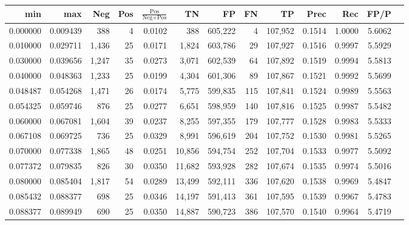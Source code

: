 \begin{tabular}{rrrrrrrrrrrrr}
\toprule
     min &      max &   Neg & Pos & $\frac{\text{Pos}}{\text{Neg}+\text{Pos}}$ &      TN &      FP &      FN &      TP &   Prec &    Rec &   FP/P \\
\midrule
0.000000 & 0.009439 &   388 &   4 &                                     0.0102 &     388 & 605,222 &       4 & 107,952 & 0.1514 & 1.0000 & 5.6062 \\
0.010000 & 0.029711 & 1,436 &  25 &                                     0.0171 &   1,824 & 603,786 &      29 & 107,927 & 0.1516 & 0.9997 & 5.5929 \\
0.030000 & 0.039656 & 1,247 &  35 &                                     0.0273 &   3,071 & 602,539 &      64 & 107,892 & 0.1519 & 0.9994 & 5.5813 \\
0.040000 & 0.048363 & 1,233 &  25 &                                     0.0199 &   4,304 & 601,306 &      89 & 107,867 & 0.1521 & 0.9992 & 5.5699 \\
0.048487 & 0.054268 & 1,471 &  26 &                                     0.0174 &   5,775 & 599,835 &     115 & 107,841 & 0.1524 & 0.9989 & 5.5563 \\
0.054325 & 0.059746 &   876 &  25 &                                     0.0277 &   6,651 & 598,959 &     140 & 107,816 & 0.1525 & 0.9987 & 5.5482 \\
0.060000 & 0.067081 & 1,604 &  39 &                                     0.0237 &   8,255 & 597,355 &     179 & 107,777 & 0.1528 & 0.9983 & 5.5333 \\
0.067108 & 0.069725 &   736 &  25 &                                     0.0329 &   8,991 & 596,619 &     204 & 107,752 & 0.1530 & 0.9981 & 5.5265 \\
0.070000 & 0.077338 & 1,865 &  48 &                                     0.0251 &  10,856 & 594,754 &     252 & 107,704 & 0.1533 & 0.9977 & 5.5092 \\
0.077372 & 0.079835 &   826 &  30 &                                     0.0350 &  11,682 & 593,928 &     282 & 107,674 & 0.1535 & 0.9974 & 5.5016 \\
0.080000 & 0.085404 & 1,817 &  54 &                                     0.0289 &  13,499 & 592,111 &     336 & 107,620 & 0.1538 & 0.9969 & 5.4847 \\
0.085432 & 0.088377 &   698 &  25 &                                     0.0346 &  14,197 & 591,413 &     361 & 107,595 & 0.1539 & 0.9967 & 5.4783 \\
0.088377 & 0.089949 &   690 &  25 &                                     0.0350 &  14,887 & 590,723 &     386 & 107,570 & 0.1540 & 0.9964 & 5.4719 \\

\end{tabular}
